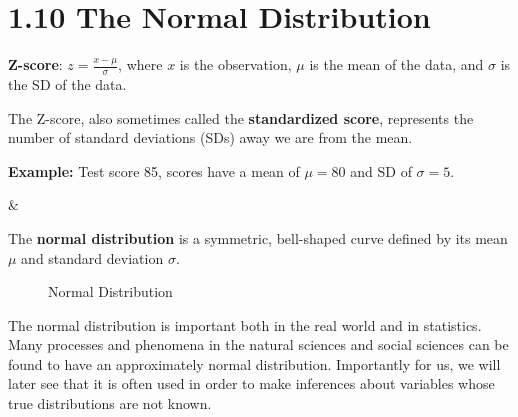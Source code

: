 \section*{1.10 The Normal Distribution}
\begin{tcolorbox}[title=Key Formulas, colback=green!5!white, colframe=green!70!black, breakable]
\textbf{Z-score}: \( z = \frac{x - \mu}{\sigma} \), where $x$ is the observation, $\mu$ is the mean of the data, and $\sigma$ is the SD of the data.
\end{tcolorbox}
The Z-score, also sometimes called the \textbf{standardized score}, represents the number of standard deviations (SDs) away we are from the mean. 
\par\medskip

\textbf{Example:} Test score 85, scores have a mean of \( \mu = 80 \) and SD of \( \sigma = 5\). 
\par\medskip

\begin{flushlefttab}
& 
\end{flushlefttab}
\par\medskip

\begin{tcolorbox}[title=Key Terms, colback=blue!5!white, colframe=blue!75!black, breakable]
The \textbf{normal distribution} is a symmetric, bell-shaped curve defined by its mean \( \mu \) and standard deviation \( \sigma \).
\end{tcolorbox}
\begin{center}
\begin{figure}
\caption*{Normal Distribution}
\end{figure}
\end{center}
\par\medskip

The normal distribution is important both in the real world and in statistics. Many processes and phenomena in the natural sciences and social sciences can be found to have an approximately normal distribution. Importantly for us, we will later see that it is often used in order to make inferences about variables whose true distributions are not known. \\
\par\medskip

